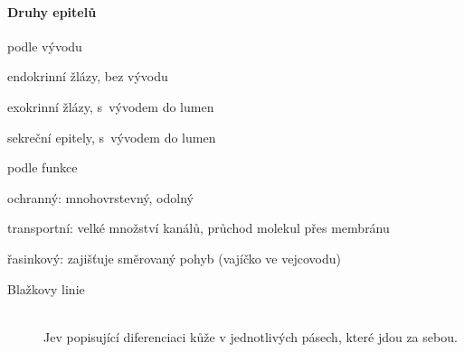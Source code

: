 \documentclass[DIV=8]{scrreprt}
\begin{document}
\paragraph{Druhy epitelů}
\begin{myItemize}[nosep]
    \item podle vývodu
\begin{myItemize}[nosep]
    \item endokrinní žlázy, bez vývodu
    \item exokrinní žlázy, s vývodem do lumen
    \item sekreční epitely, s vývodem do lumen
\end{myItemize}

    \item podle funkce
\begin{myItemize}[nosep]
    \item ochranný: mnohovrstevný, odolný
    \item transportní:  velké množství kanálů, průchod molekul přes membránu
    \item řasinkový: zajišťuje směrovaný pohyb (vajíčko ve vejcovodu)
\end{myItemize}

\end{myItemize}




\begin{description}
\item[Blažkovy linie]\hfill \\
Jev popisující diferenciaci kůže v jednotlivých pásech, které jdou za sebou.

\end{description}
\end{document}
